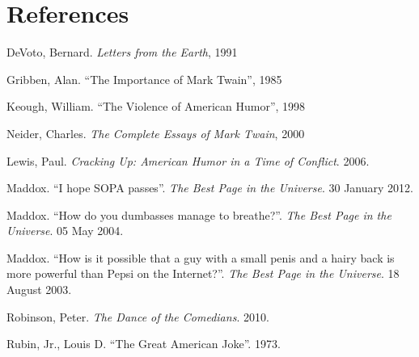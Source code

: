 \section{References}

\bibent DeVoto, Bernard. \textit{Letters from the Earth}, 1991

\bibent Gribben, Alan. ``The Importance of Mark Twain'', 1985

\bibent Keough, William. ``The Violence of American Humor'', 1998

\bibent Neider, Charles. \textit{The Complete Essays of Mark Twain}, 2000

\bibent Lewis, Paul. \textit{Cracking Up: American Humor in a Time of Conflict}. 2006.

\bibent Maddox. ``I hope SOPA passes''. \textit{The Best Page in the Universe}. 30 January 2012.

\bibent Maddox. ``How do you dumbasses manage to breathe?''. \textit{The Best Page in the Universe}. 05 May 2004.

\bibent Maddox. ``How is it possible that a guy with a small penis and a hairy back is more powerful than Pepsi on the Internet?''. \textit{The Best Page in the Universe}. 18 August 2003.

\bibent Robinson, Peter. \textit{The Dance of the Comedians}. 2010.

\bibent Rubin, Jr., Louis D. ``The Great American Joke''. 1973.
